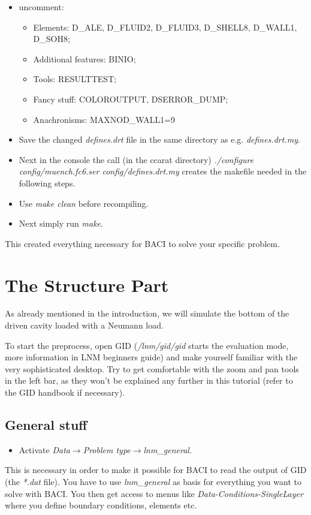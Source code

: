 \begin{itemize}
\item uncomment:

\begin{itemize}
\item Elements: D\_ALE, D\_FLUID2, D\_FLUID3, D\_SHELL8, D\_WALL1, D\_SOH8;
\item Additional features: BINIO;
\item Tools: RESULTTEST;
\item Fancy stuff: COLOROUTPUT, DSERROR\_DUMP;
\item Anachronisms: MAXNOD\_WALL1=9
\end{itemize}
\item Save the changed \emph{defines.drt} file in the same directory as e.g.
\emph{defines.drt.my}.
\item Next in the console the call (in the ccarat directory) \emph{./configure
config/muench.fc6.ser config/defines.drt.my} creates the makefile needed
in the following steps.
\item Use \emph{make clean} before recompiling.
\item Next simply run \emph{make}.
\end{itemize}
This created everything necessary for BACI to solve your specific
problem.


\section{The Structure Part}

As already mentioned in the introduction, we will simulate the bottom
of the driven cavity loaded with a Neumann load.

To start the preprocess, open GID (\emph{/lnm/gid/gid} starts the evaluation
mode, more information in LNM beginners guide) and make yourself familiar with
the very sophisticated desktop. Try to get comfortable with the zoom
and pan tools in the left bar, as they won't be explained any further
in this tutorial (refer to the GID handbook if necessary).


\subsection{General stuff}

\begin{itemize}
\item Activate \emph{Data$\to$Problem type$\to$lnm\_general.}
\end{itemize}
This is necessary in order to make it possible for BACI to read the
output of GID (the \emph{{*}.dat} file). You have to use \emph{lnm\_general}
as basis for everything you want to solve with BACI. You then get
access to menus like \emph{Data-Conditions-SingleLayer} where you
define boundary conditions, elements etc.

